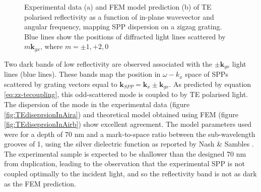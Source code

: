 \begin{figure}
	\begin{center}
	\end{center}
	
	\caption[SPP dispersion on a zigzag grating measured using TE polarised light.]{Experimental data (a) and FEM model prediction (b) of TE polarised reflectivity as a function of in-plane wavevector and angular frequency, mapping  SPP dispersion on a zigzag grating. \color{blue}Blue \color{black} lines show the positions of diffracted light lines scattered by $m\mathbf{k}_{gx}$, where $m = \pm 1, +2,  0$\label{fig:TEdiseprsionInAir}}
\end{figure}

Two dark bands of low reflectivity are observed associated with the $\pm\mathbf{k}_{gx}$ light lines (blue lines). These bands map the position in $\omega-k_x$ space of SPPs scattered by grating vectors equal to  $\mathbf{k}_{SPP}=\mathbf{k}_x\pm \mathbf{k}_{gx}$. As predicted by equation \ref{eq:zz-tecoupling}, this odd-scattered mode is coupled to by TE polarised light. The dispersion of the mode in the experimental data (figure \ref{fig:TEdiseprsionInAira}) and theoretical model obtained using FEM (figure \ref{fig:TEdiseprsionInAirb}) show excellent agreement. The model parameters used were for a depth of 70 nm and a mark-to-space ratio between the sub-wavelength grooves of 1, using the silver dielectric function as reported by Nash \& Sambles \cite{Nash1996}. The experimental sample is expected to be shallower than the designed 70 nm from duplication, leading to the observation that the experimental SPP is not coupled optimally to the incident light, and so the reflectivity band is not as dark as the FEM prediction.

